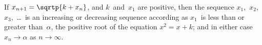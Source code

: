 If $x_{n+1} = \sqrtp{k + x_{n}}$, and $k$~and~$x_{1}$ are positive, then the sequence $x_{1}$,~$x_{2}$,
$x_{3}$,~\dots\ is an increasing or decreasing sequence according as $x_{1}$~is less than or
greater than~$\alpha$, the positive root of the equation $x^{2} = x + k$; and in either case
$x_{n} \to \alpha$ as $n \to \infty$.

